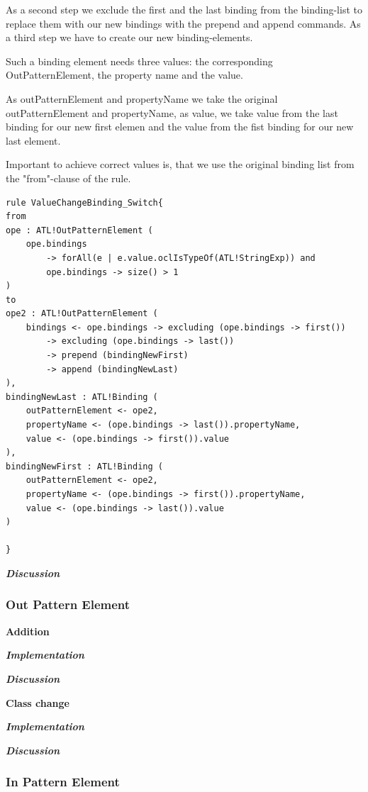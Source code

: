 \documentclass{llncs}
\begin{document}
As a second step we exclude the first and the last binding from the binding-list to replace them with our new bindings with the prepend and append commands. As a third step we have to create our new binding-elements.

Such a binding element needs three values: the corresponding OutPatternElement, the property name and the value.

As outPatternElement and propertyName we take the original outPatternElement and propertyName, as value, we take value from the last binding for our new first elemen and the value from the fist binding for our new last element.

Important to achieve correct values is, that we use the original binding list from the "from"-clause of the rule.

\begin{lstlisting}
rule ValueChangeBinding_Switch{
from
ope : ATL!OutPatternElement (
	ope.bindings 
		-> forAll(e | e.value.oclIsTypeOf(ATL!StringExp)) and
		ope.bindings -> size() > 1
)
to
ope2 : ATL!OutPatternElement (
	bindings <- ope.bindings -> excluding (ope.bindings -> first()) 
		-> excluding (ope.bindings -> last())
		-> prepend (bindingNewFirst)
		-> append (bindingNewLast)
), 
bindingNewLast : ATL!Binding (
	outPatternElement <- ope2, 
	propertyName <- (ope.bindings -> last()).propertyName,
	value <- (ope.bindings -> first()).value
),
bindingNewFirst : ATL!Binding (
	outPatternElement <- ope2,
	propertyName <- (ope.bindings -> first()).propertyName,
	value <- (ope.bindings -> last()).value	
)
	
}
\end{lstlisting}

\textbf\textit{{Discussion}}

\subsubsection{Out Pattern Element}

\textbf{Addition}

\textbf\textit{{Implementation}}

\textbf\textit{{Discussion}}

\textbf{Class change}

\textbf\textit{{Implementation}}

\textbf\textit{{Discussion}}

\subsubsection{In Pattern Element}
\end{document}
